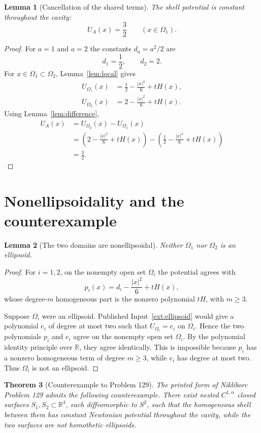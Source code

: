\documentclass[11pt]{article}
\newtheorem{theorem}{Theorem}[section]
\newtheorem{lemma}[theorem]{Lemma}
\theoremstyle{definition}
\theoremstyle{remark}
\newcommand{\R}{\mathbb{R}}
\newcommand{\Om}{\Omega}
\newcommand{\1}{\mathbf{1}}
\begin{document}
\begin{lemma}[Cancellation of the shared terms]\label{lem:cancellation}
The shell potential is constant throughout the cavity:
\[
 U_A(x)=\frac32
 \qquad(x\in\Om_1).
\]
\end{lemma}

\begin{proof}
For $a=1$ and $a=2$ the constants $d_a=a^2/2$ are
\[
 d_1=\frac12,
 \qquad
 d_2=2.
\]
For $x\in\Om_1\subset\Om_2$, Lemma~\ref{lem:local} gives
\begin{align*}
 U_{\Om_1}(x)&=\frac12-\frac{|x|^2}{6}+tH(x),\\
 U_{\Om_2}(x)&=2-\frac{|x|^2}{6}+tH(x).
\end{align*}
Using Lemma~\ref{lem:difference},
\begin{align*}
 U_A(x)
 &=U_{\Om_2}(x)-U_{\Om_1}(x)\\
 &=\left(2-\frac{|x|^2}{6}+tH(x)\right)
   -\left(\frac12-\frac{|x|^2}{6}+tH(x)\right)\\
 &=\frac32.
\end{align*}
\end{proof}

\section{Nonellipsoidality and the counterexample}

\begin{lemma}[The two domains are nonellipsoidal]\label{lem:nonellipsoid}
Neither $\Om_1$ nor $\Om_2$ is an ellipsoid.
\end{lemma}

\begin{proof}
For $i=1,2$, on the nonempty open set $\Om_i$ the potential agrees with
\[
 p_i(x)=d_i-\frac{|x|^2}{6}+tH(x),
\]
whose degree-$m$ homogeneous part is the nonzero polynomial $tH$, with $m\ge3$.

Suppose $\Om_i$ were an ellipsoid. Published Input~\ref{ext:ellipsoid} would give a polynomial $e_i$ of degree at most two such that $U_{\Om_i}=e_i$ on $\Om_i$. Hence the two polynomials $p_i$ and $e_i$ agree on the nonempty open set $\Om_i$. By the polynomial identity principle over $\R$, they agree identically. This is impossible because $p_i$ has a nonzero homogeneous term of degree $m\ge3$, while $e_i$ has degree at most two. Thus $\Om_i$ is not an ellipsoid.
\end{proof}

\begin{theorem}[Counterexample to Problem 129]\label{thm:counterexample129}
The printed form of Nikliborc Problem 129 admits the following counterexample. There exist nested $C^{1,\alpha}$ closed surfaces $S_1,S_2\subset\R^3$, each diffeomorphic to $S^2$, such that the homogeneous shell between them has constant Newtonian potential throughout the cavity, while the two surfaces are not homothetic ellipsoids.
\end{theorem}
\end{document}
